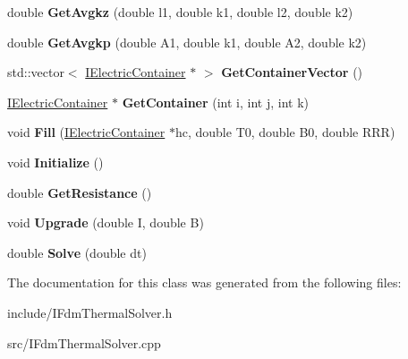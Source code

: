 \begin{DoxyCompactItemize}
\item 
\hypertarget{class_f_d_m_1_1_i_fdm_thermal_solver_a45ba6f846f46a0e87a244ca3afe480c8}{}double {\bfseries Get\+Avgkz} (double l1, double k1, double l2, double k2)\label{class_f_d_m_1_1_i_fdm_thermal_solver_a45ba6f846f46a0e87a244ca3afe480c8}

\item 
\hypertarget{class_f_d_m_1_1_i_fdm_thermal_solver_a274fb08fa7c73e7884fd7c64108f2dbd}{}double {\bfseries Get\+Avgkp} (double A1, double k1, double A2, double k2)\label{class_f_d_m_1_1_i_fdm_thermal_solver_a274fb08fa7c73e7884fd7c64108f2dbd}

\item 
\hypertarget{class_f_d_m_1_1_i_fdm_thermal_solver_a8ae47baaa719f253b5bd4fb8cd0ec254}{}std\+::vector$<$ \hyperlink{class_i_electric_container}{I\+Electric\+Container} $\ast$ $>$ {\bfseries Get\+Container\+Vector} ()\label{class_f_d_m_1_1_i_fdm_thermal_solver_a8ae47baaa719f253b5bd4fb8cd0ec254}

\item 
\hypertarget{class_f_d_m_1_1_i_fdm_thermal_solver_a79b6af8bfdbcde5dae93584212cc4f22}{}\hyperlink{class_i_electric_container}{I\+Electric\+Container} $\ast$ {\bfseries Get\+Container} (int i, int j, int k)\label{class_f_d_m_1_1_i_fdm_thermal_solver_a79b6af8bfdbcde5dae93584212cc4f22}

\item 
\hypertarget{class_f_d_m_1_1_i_fdm_thermal_solver_aaa9e2b5ada1c065e57a049859c1057d0}{}void {\bfseries Fill} (\hyperlink{class_i_electric_container}{I\+Electric\+Container} $\ast$hc, double T0, double B0, double R\+R\+R)\label{class_f_d_m_1_1_i_fdm_thermal_solver_aaa9e2b5ada1c065e57a049859c1057d0}

\item 
\hypertarget{class_f_d_m_1_1_i_fdm_thermal_solver_a28244f081d9b8de9adb02cd8daf8a700}{}void {\bfseries Initialize} ()\label{class_f_d_m_1_1_i_fdm_thermal_solver_a28244f081d9b8de9adb02cd8daf8a700}

\item 
\hypertarget{class_f_d_m_1_1_i_fdm_thermal_solver_a90d03549675060e723be7d790e702526}{}double {\bfseries Get\+Resistance} ()\label{class_f_d_m_1_1_i_fdm_thermal_solver_a90d03549675060e723be7d790e702526}

\item 
\hypertarget{class_f_d_m_1_1_i_fdm_thermal_solver_a10dac861aa09a8d27cbd45e76cfad90e}{}void {\bfseries Upgrade} (double I, double B)\label{class_f_d_m_1_1_i_fdm_thermal_solver_a10dac861aa09a8d27cbd45e76cfad90e}

\item 
\hypertarget{class_f_d_m_1_1_i_fdm_thermal_solver_aee6b3cf30cabb97dfab7268b8ae99780}{}double {\bfseries Solve} (double dt)\label{class_f_d_m_1_1_i_fdm_thermal_solver_aee6b3cf30cabb97dfab7268b8ae99780}

\end{DoxyCompactItemize}


The documentation for this class was generated from the following files\+:\begin{DoxyCompactItemize}
\item 
include/I\+Fdm\+Thermal\+Solver.\+h\item 
src/I\+Fdm\+Thermal\+Solver.\+cpp\end{DoxyCompactItemize}
